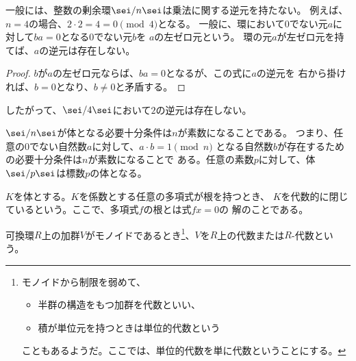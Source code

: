 	\begin{note}[整数の剰余体]\label{note:整数の剰余体} %
		一般には、整数の剰余環$\sei/n\sei$は乗法に関する逆元を持たない。
		例えば、$n=4$の場合、$2\cdot 2=4=0\pmod{4}$となる。
		一般に、環において$0$でない元$a$に対して$ba=0$となる$0$でない元$b$を
		$a$の左ゼロ元という。
		環の元$a$が左ゼロ元を持てば、$a$の逆元は存在しない。
		\begin{proof} %
			$b$が$a$の左ゼロ元ならば、$ba=0$となるが、この式に$a$の逆元を
			右から掛ければ、$b=0$となり、$b\neq0$と矛盾する。
		\end{proof} %
		したがって、$\sei/4\sei$において$2$の逆元は存在しない。

		$\sei/n\sei$が体となる必要十分条件は$n$が素数になることである。
		つまり、任意の$0$でない自然数$a$に対して、$a\cdot b = 1 \pmod{n}$
		となる自然数$b$が存在するための必要十分条件は$n$が素数になることで
		ある。任意の素数$p$に対して、体$\sei/p\sei$は標数$p$の体となる。
	\end{note} %

	\begin{definition}[代数的に閉じた体]\label{def:代数的に閉じた体} %
		$K$を体とする。$K$を係数とする任意の多項式が根を持つとき、
		$K$を代数的に閉じているという。ここで、多項式$f$の根とは式$fx=0$の
		解のことである。
	\end{definition} %

	\begin{definition}[環上の代数]\label{def:環上の代数} %
		可換環$R$上の加群$V$がモノイドであるとき\footnote{
			モノイドから制限を弱めて、
			\begin{itemize}\setlength{\itemsep}{-1mm} %
				\item 半群の構造をもつ加群を代数といい、
				\item 積が単位元を持つときは単位的代数という
			\end{itemize} %
			こともあるようだ。ここでは、単位的代数を単に代数ということにする。
		}、$V$を$R$上の代数または$R$-代数という。
	\end{definition} %

